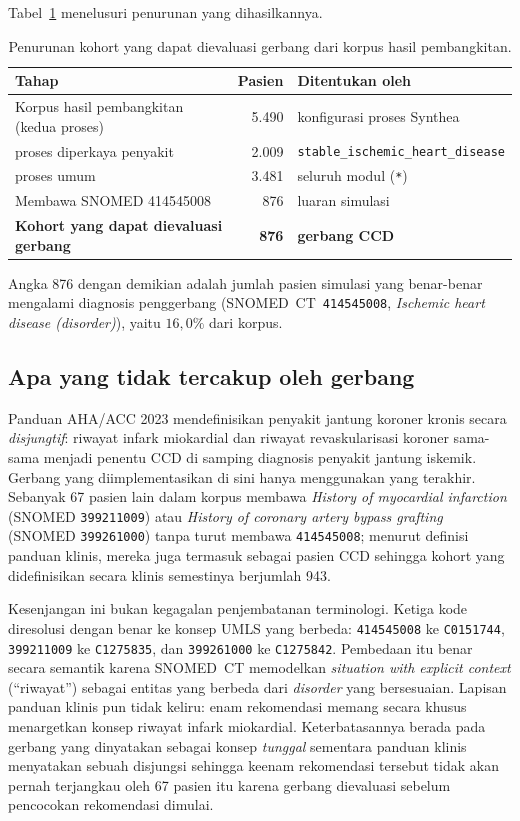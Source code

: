Tabel~\ref{tab:cohort-funnel} menelusuri penurunan yang dihasilkannya.

\begin{table}[h]
\centering
\caption{Penurunan kohort yang dapat dievaluasi gerbang dari korpus hasil pembangkitan.}
\label{tab:cohort-funnel}
\begin{tabular}{lrl}
\hline
\textbf{Tahap} & \textbf{Pasien} & \textbf{Ditentukan oleh} \\
\hline
Korpus hasil pembangkitan (kedua proses) & 5{.}490 & konfigurasi proses Synthea \\
\quad proses diperkaya penyakit          & 2{.}009 & \texttt{stable\_ischemic\_heart\_disease} \\
\quad proses umum                        & 3{.}481 & seluruh modul (\texttt{*}) \\
Membawa SNOMED 414545008                 &    876  & luaran simulasi \\
\textbf{Kohort yang dapat dievaluasi gerbang} & \textbf{876} & \textbf{gerbang CCD} \\
\hline
\end{tabular}
\end{table}

Angka 876 dengan demikian adalah jumlah pasien simulasi yang benar-benar mengalami diagnosis
penggerbang (SNOMED~CT~\texttt{414545008}, \emph{Ischemic heart disease (disorder)}), yaitu $16{,}0\%$ dari korpus.

\subsection{Apa yang tidak tercakup oleh gerbang}
Panduan AHA/ACC 2023 mendefinisikan penyakit jantung koroner kronis secara \emph{disjungtif}:
riwayat infark miokardial dan riwayat revaskularisasi koroner sama-sama menjadi penentu CCD di
samping diagnosis penyakit jantung iskemik. Gerbang yang diimplementasikan di sini hanya
menggunakan yang terakhir. Sebanyak 67 pasien lain dalam korpus membawa \emph{History of
myocardial infarction} (SNOMED \texttt{399211009}) atau \emph{History of coronary artery
bypass grafting} (SNOMED \texttt{399261000}) tanpa turut membawa \texttt{414545008}; menurut
definisi panduan klinis, mereka juga termasuk sebagai pasien CCD sehingga kohort yang didefinisikan
secara klinis semestinya berjumlah 943.

Kesenjangan ini bukan kegagalan penjembatanan terminologi. Ketiga kode diresolusi dengan benar ke konsep UMLS yang berbeda: \texttt{414545008} ke
\texttt{C0151744}, \texttt{399211009} ke \texttt{C1275835}, dan \texttt{399261000} ke
\texttt{C1275842}. Pembedaan itu benar secara semantik karena SNOMED~CT memodelkan
\emph{situation with explicit context} (``riwayat'') sebagai entitas yang berbeda dari
\emph{disorder} yang bersesuaian.
Lapisan panduan klinis pun tidak keliru: enam rekomendasi memang secara khusus menargetkan konsep riwayat infark miokardial.
Keterbatasannya berada pada gerbang yang dinyatakan sebagai
konsep \emph{tunggal} sementara panduan klinis menyatakan sebuah disjungsi sehingga keenam
rekomendasi tersebut tidak akan pernah terjangkau oleh 67 pasien itu karena gerbang
dievaluasi sebelum pencocokan rekomendasi dimulai.

